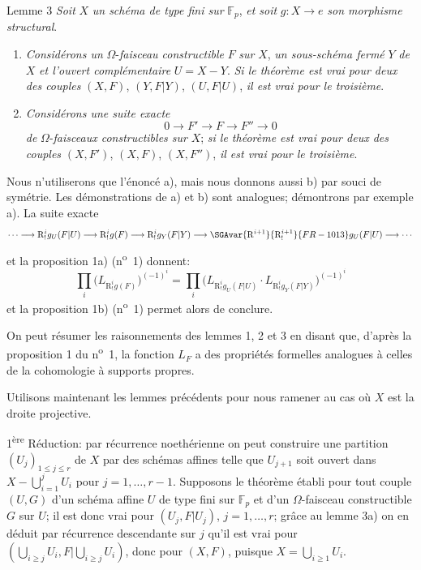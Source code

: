 \begin{statement}{Lemme 3}
\emph{Soit} $X$ \emph{un schéma de type fini sur} $\mathbb{F}_p$, \emph{et soit} $g:X\to e$ \emph{son morphisme structural}.
\begin{enumerate}[label=\alph*)]
\item \emph{Considérons un} $\Omega$-\emph{faisceau constructible} $F$ \emph{sur} $X$, \emph{un sous-schéma fermé} $Y$ \emph{de} $X$ \emph{et l'ouvert complémentaire} $U=X-Y$. \emph{Si le théorème est vrai pour deux des couples} $(X,F)$, $(Y,F|Y)$, $(U,F|U)$, \emph{il est vrai pour le troisième}.
\item \emph{Considérons une suite exacte}
\[
0\longrightarrow F'\longrightarrow F\longrightarrow F''\longrightarrow0
\]
\emph{de} $\Omega$-\emph{faisceaux constructibles sur} $X$; \emph{si le théorème est vrai pour deux des couples} $(X,F')$, $(X,F)$, $(X,F'')$, \emph{il est vrai pour le troisième}.
\end{enumerate}
\end{statement}

Nous n'utiliserons que l'énoncé a), mais nous donnons aussi b) par souci de symétrie. Les démonstrations de a) et b) sont analogues; démontrons par exemple a). La suite exacte
\[
\cdots\longrightarrow \mathrm{R}^i_!g_U(F|U)\longrightarrow \mathrm{R}^i_!g(F)
\longrightarrow \mathrm{R}^i_!g_Y(F|Y)\longrightarrow \SGAvar{\mathrm{R}^{i+1}}{\mathrm{R}^{i+1}_!}{FR-1013}g_U(F|U)\longrightarrow\cdots
\]
et la proposition 1a) (n\textsuperscript{o}~1) donnent:
\[
\prod_i\bigl(L_{\mathrm{R}^i_!g(F)}\bigr)^{(-1)^i}
=\prod_i\bigl(L_{\mathrm{R}^i_!g_U(F|U)}\cdot L_{\mathrm{R}^i_!g_Y(F|Y)}\bigr)^{(-1)^i}
\]
et la proposition 1b) (n\textsuperscript{o}~1) permet alors de conclure.

On peut résumer les raisonnements des lemmes 1, 2 et 3 en disant que, d'après la proposition 1 du n\textsuperscript{o}~1, la fonction $L_F$ a des propriétés formelles analogues à celles de la cohomologie à supports 
propres.

Utilisons maintenant les lemmes précédents pour nous ramener au cas où $X$ est la droite projective.

1\textsuperscript{ère} Réduction: par récurrence noethérienne on peut construire une partition $(U_j)_{1\le j\le r}$ de $X$ par des schémas affines telle que $U_{j+1}$ soit ouvert dans $X-\bigcup_{i=1}^jU_i$ pour $j=1,\ldots,r-1$. Supposons le théorème établi pour tout couple $(U,G)$ d'un schéma affine $U$ de type fini sur $\mathbb{F}_p$ et d'un $\Omega$-faisceau constructible $G$ sur $U$; il est donc vrai pour $(U_j,F|U_j)$, $j=1,\ldots,r$; grâce au lemme 3a) on en déduit par récurrence descendante sur $j$ qu'il est vrai pour $(\bigcup_{i\ge j}U_i,F|\bigcup_{i\ge j}U_i)$, donc pour $(X,F)$, puisque $X=\bigcup_{i\ge1}U_i$.

